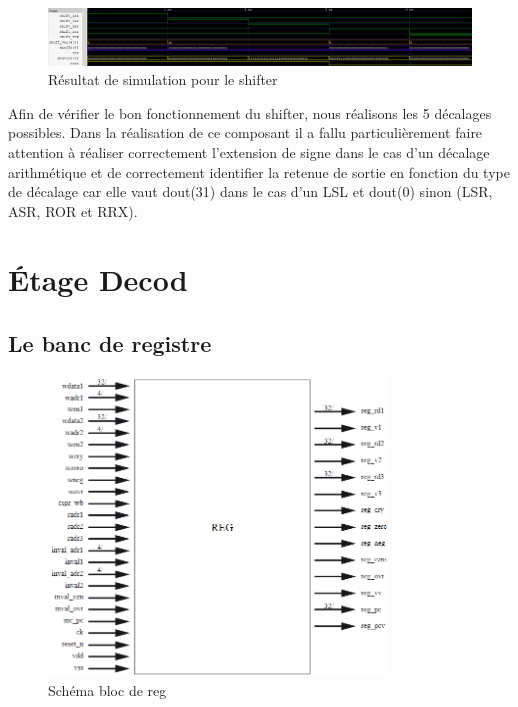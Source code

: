 \documentclass[10pt,a4paper]{article}
\begin{document}
			\begin{figure}[H]															%
				\centering 																%
				\includegraphics[width=1.0\textwidth]{shifter_gtkwave.png} 				%
				\caption{Résultat de simulation pour le shifter}						%
				\label{Fig.main2} 														%
			\end{figure}
			Afin de vérifier le bon fonctionnement du shifter, nous réalisons les 5 décalages possibles. 
			Dans la réalisation de ce composant il a fallu particulièrement faire attention à réaliser 
			correctement l'extension de signe dans le cas d’un décalage arithmétique et de correctement 
			identifier la retenue de sortie en fonction du type de décalage car elle vaut dout(31) dans le cas 
			d'un LSL et dout(0) sinon (LSR, ASR, ROR et RRX).
	\newpage
	
	\section{Étage Decod}                      								%
		\subsection{Le banc de registre}
			\begin{figure}[H]															%
				\centering 																%
				\includegraphics[width=0.8\textwidth]{reg.png} 							%
				\caption{Schéma bloc de reg}											%
				\label{Fig.main2} 														%
			\end{figure}
			
\end{document}
